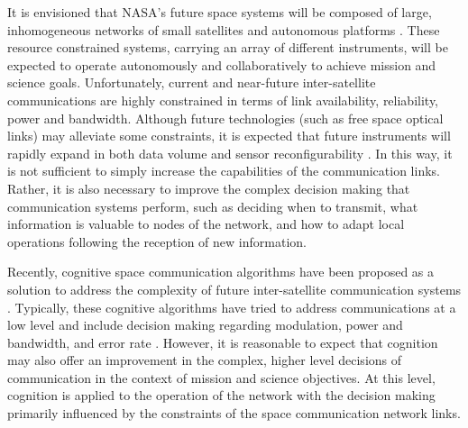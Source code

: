 \documentclass[conference]{IEEEtran}
\begin{document}
It is envisioned that NASA's future space systems will be composed of large, inhomogeneous networks of small satellites and autonomous platforms \cite{ref1}.  These resource constrained systems, carrying an array of different instruments, will be expected to operate autonomously and collaboratively to achieve mission and science goals.  Unfortunately, current and near-future inter-satellite communications are highly constrained in terms of link availability, reliability, power and bandwidth.  Although future technologies (such as free space optical links) may alleviate some constraints, it is expected that future instruments will rapidly expand in both data volume and sensor reconfigurability \cite{ref2}.  In this way, it is not sufficient to simply increase the capabilities of the communication links.  Rather, it is also necessary to improve the complex decision making that communication systems perform, such as deciding when to transmit, what information is valuable to nodes of the network, and how to adapt local operations following the reception of new information.

Recently, cognitive space communication algorithms have been proposed as a solution to address the complexity of future inter-satellite communication systems \cite{ref3}.  Typically, these cognitive algorithms have tried to address communications at a low level and include decision making regarding modulation, power and bandwidth, and error rate \cite{ref4,ref5}.  However, it is reasonable to expect that cognition may also offer an improvement in the complex, higher level decisions of communication in the context of mission and science objectives.  At this level, cognition is applied to the operation of the network with the decision making primarily influenced by the constraints of the space communication network links.
\end{document}
